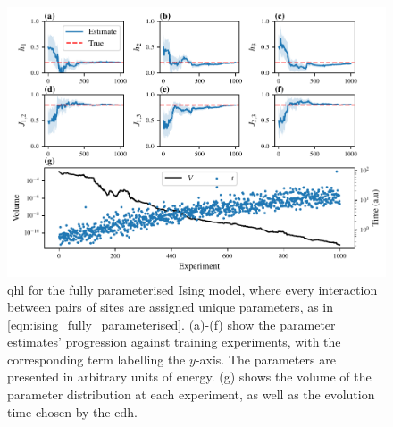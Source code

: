 \begin{figure}
    \begin{center}
        \includegraphics{theoretical_study/figures/fully_param_ising_qhl.pdf}
    \end{center}
    \caption[ for the fully parameterised Ising model]{
        \Acrlong{qhl} for the fully parameterised Ising model, 
            where every interaction between pairs of sites are assigned unique parameters, 
            as in \cref{eqn:ising_fully_parameterised}. 
        (a)-(f) show the parameter estimates' progression against training experiments, 
            with the corresponding term labelling the $y$-axis. 
            The parameters are presented in arbitrary units of energy. 
        (g) shows the \gls{volume} of the parameter distribution at each experiment, 
            as well as the evolution time chosen by the \gls{edh}.  
        \figtableref
    }
    \label{fig:ising_fully_parameterised}
\end{figure}

